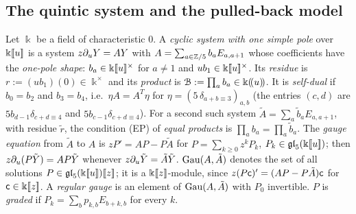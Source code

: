 
\subsection{The quintic system and the pulled-back model}
\label{sec:gau-systems}

\begin{defn}
\label{def:gau-onepole}
Let $\Bbbk$ be a field of characteristic $0$. A \emph{cyclic system with one simple pole} over $\Bbbk[\![ u ]\!]$ is a system $z\partial_uY=AY$ with $A=\sum_{a\in\mathbb{Z}/5}b_aE_{a,a+1}$ whose coefficients have the \emph{one-pole shape}: $b_a\in\Bbbk[\![ u ]\!]^\times$ for $a\neq1$ and $ub_1\in\Bbbk[\![ u ]\!]^\times$. Its \emph{residue} is $r:=(ub_1)(0)\in\Bbbk^\times$ and its \emph{product} is $\mathcal{B}:=\prod_ab_a\in\Bbbk(\!(u)\!)$. It is \emph{self-dual} if $b_0=b_2$ and $b_3=b_4$, i.e.\ $\eta A=A^T\eta$ for $\eta=(5\,\delta_{a+b\equiv3})_{a,b}$ (the entries $(c,d)$ are $5b_{d-1}\delta_{c+d\equiv4}$ and $5b_{c-1}\delta_{c+d\equiv4}$). For a second such system $\tilde A=\sum_a\tilde b_aE_{a,a+1}$, with residue $\tilde r$, the condition (EP) of \emph{equal products} is $\prod_ab_a=\prod_a\tilde b_a$. The \emph{gauge equation} from $\tilde A$ to $A$ is $zP'=AP-P\tilde A$ for $P=\sum_{k\geq0}z^kP_k$, $P_k\in\mathfrak{gl}_5(\Bbbk[\![ u ]\!])$; then $z\partial_u(P\tilde Y)=AP\tilde Y$ whenever $z\partial_u\tilde Y=\tilde A\tilde Y$. $\operatorname{Gau}(A,\tilde A)$ denotes the set of all solutions $P\in\mathfrak{gl}_5(\Bbbk[\![ u ]\!])[\![ z ]\!]$; it is a $\Bbbk[\![ z ]\!]$-module, since $z(P\mathsf{c})'=(AP-P\tilde A)\mathsf{c}$ for $\mathsf{c}\in\Bbbk[\![ z ]\!]$. A \emph{regular gauge} is an element of $\operatorname{Gau}(A,\tilde A)$ with $P_0$ invertible. $P$ is \emph{graded} if $P_k=\sum_bp_{k,b}E_{b+k,b}$ for every $k$.
\end{defn}

